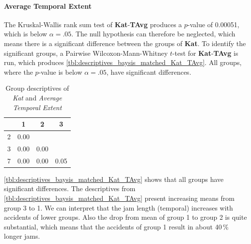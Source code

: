 \paragraph{Average Temporal Extent}
The Kruskal-Wallis rank sum test of \textbf{Kat}-\textbf{TAvg} produces a $p$-value of 0.00051, which is below $\alpha=.05$. The null hypothesis can therefore be neglected, which means there is a significant difference between the groups of \textbf{Kat}. To identify the significant groups, a Pairwise Wilcoxon-Mann-Whitney $t$-test for \textbf{Kat}-\textbf{TAvg} is run, which produces \autoref{tbl:descriptives_baysis_matched_Kat_TAvg}. All groups, where the $p$-value is below $\alpha=.05$, have significant differences. 
\begin{table}[ht]
	\small
	\centering
	\begin{tabular}{c|c|c|c}
	  	\toprule
	 	& 1 & 2 & 3 \\ 
	  	\midrule
		2 & 0.00 &  &  \\ 
	  	3 & 0.00 & 0.00 &  \\ 
	  	7 & 0.00 & 0.00 & 0.05 \\ 
	   	\bottomrule
	\end{tabular}
	\caption{Group descriptives of \textit{Kat} and \textit{Average Temporal Extent}}
	\label{tbl:descriptives_baysis_matched_Kat_TAvg}
\end{table}
\autoref{tbl:descriptives_baysis_matched_Kat_TAvg} shows that all groups have significant differences. The descriptives from \autoref{tbl:descriptives_baysis_matched_Kat_TAvg} present increasing means from group 3 to 1.	We can interpret that the jam length (temporal) increases with accidents of lower groups. Also the drop from mean of group 1 to group 2 is quite substantial, which means that the accidents of group 1 result in about 40\,\% longer jams.
